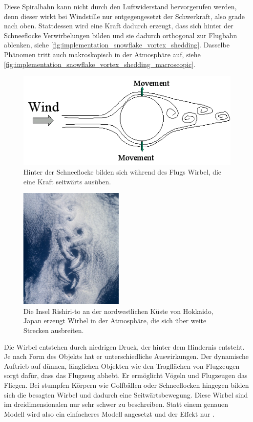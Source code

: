Diese Spiralbahn kann nicht durch den Luftwiderstand hervorgerufen
werden, denn dieser wirkt bei Windstille nur entgegengesetzt der
Schwerkraft, also grade nach oben. Stattdessen wird eine Kraft dadurch
erzeugt, dass sich hinter der Schneeflocke Verwirbelungen bilden und
sie dadurch orthogonal zur Flugbahn ablenken, siehe
\autoref{fig:implementation_snowflake_vortex_shedding}. Dasselbe
Phänomen tritt auch makroskopisch in der Atmosphäre auf, siehe
\autoref{fig:implementation_snowflake_vortex_shedding_macroscopic}.

\begin{figure}[ht]
    \centering
    \includegraphics{images/vortex_shedding}
    \caption{Hinter der Schneeflocke bilden sich während des Flugs Wirbel, die eine Kraft seitwärts ausüben.}
    \label{fig:implementation_snowflake_vortex_shedding}
\end{figure}

\begin{figure}[ht]
    \centering
    \includegraphics{images/vortex_shedding_macroscopic}
    \caption{Die Insel Rishiri-to an der nordwestlichen Küste von Hokkaido, Japan erzeugt Wirbel in der Atmosphäre, die sich über weite Strecken ausbreiten.}
    \label{fig:implementation_snowflake_vortex_shedding_macroscopic}
\end{figure}

Die Wirbel entstehen durch niedrigen Druck, der hinter dem Hindernis
entsteht. Je nach Form des Objekts hat er unterschiedliche
Auswirkungen. Der dynamische Auftrieb auf dünnen, länglichen Objekten
wie den Tragflächen von Flugzeugen sorgt dafür, dass das Flugzeug
abhebt. Er ermöglicht Vögeln und Flugzeugen das Fliegen. Bei stumpfen
Körpern wie Golfbällen oder Schneeflocken hingegen bilden sich die
besagten Wirbel und dadurch eine Seitwärtsbewegung. Diese Wirbel sind
im dreidimensionalen nur sehr schwer zu beschreiben. Statt einem
genauen Modell wird also ein einfacheres Modell angesetzt und der
Effekt nur .

